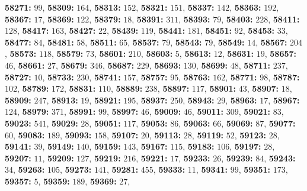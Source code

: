 \textsf{\bfseries 58271:} $99$, \textsf{\bfseries 58309:} $164$, \textsf{\bfseries 58313:} $152$, \textsf{\bfseries 58321:} $151$, \textsf{\bfseries 58337:} $142$, \textsf{\bfseries 58363:} $192$, \textsf{\bfseries 58367:} $17$, \textsf{\bfseries 58369:} $122$, \textsf{\bfseries 58379:} $18$, \textsf{\bfseries 58391:} $311$, \textsf{\bfseries 58393:} $79$, \textsf{\bfseries 58403:} $228$, \textsf{\bfseries 58411:} $128$, \textsf{\bfseries 58417:} $163$, \textsf{\bfseries 58427:} $22$, \textsf{\bfseries 58439:} $119$, \textsf{\bfseries 58441:} $181$, \textsf{\bfseries 58451:} $92$, \textsf{\bfseries 58453:} $33$, \textsf{\bfseries 58477:} $84$, \textsf{\bfseries 58481:} $58$, \textsf{\bfseries 58511:} $65$, \textsf{\bfseries 58537:} $79$, \textsf{\bfseries 58543:} $79$, \textsf{\bfseries 58549:} $14$, \textsf{\bfseries 58567:} $204$, \textsf{\bfseries 58573:} $118$, \textsf{\bfseries 58579:} $73$, \textsf{\bfseries 58601:} $210$, \textsf{\bfseries 58603:} $5$, \textsf{\bfseries 58613:} $12$, \textsf{\bfseries 58631:} $19$, \textsf{\bfseries 58657:} $46$, \textsf{\bfseries 58661:} $27$, \textsf{\bfseries 58679:} $346$, \textsf{\bfseries 58687:} $229$, \textsf{\bfseries 58693:} $130$, \textsf{\bfseries 58699:} $48$, \textsf{\bfseries 58711:} $237$, \textsf{\bfseries 58727:} $10$, \textsf{\bfseries 58733:} $230$, \textsf{\bfseries 58741:} $157$, \textsf{\bfseries 58757:} $95$, \textsf{\bfseries 58763:} $162$, \textsf{\bfseries 58771:} $98$, \textsf{\bfseries 58787:} $102$, \textsf{\bfseries 58789:} $172$, \textsf{\bfseries 58831:} $110$, \textsf{\bfseries 58889:} $238$, \textsf{\bfseries 58897:} $117$, \textsf{\bfseries 58901:} $43$, \textsf{\bfseries 58907:} $18$, \textsf{\bfseries 58909:} $247$, \textsf{\bfseries 58913:} $19$, \textsf{\bfseries 58921:} $195$, \textsf{\bfseries 58937:} $250$, \textsf{\bfseries 58943:} $29$, \textsf{\bfseries 58963:} $17$, \textsf{\bfseries 58967:} $124$, \textsf{\bfseries 58979:} $371$, \textsf{\bfseries 58991:} $99$, \textsf{\bfseries 58997:} $46$, \textsf{\bfseries 59009:} $46$, \textsf{\bfseries 59011:} $309$, \textsf{\bfseries 59021:} $83$, \textsf{\bfseries 59023:} $541$, \textsf{\bfseries 59029:} $28$, \textsf{\bfseries 59051:} $117$, \textsf{\bfseries 59053:} $86$, \textsf{\bfseries 59063:} $66$, \textsf{\bfseries 59069:} $87$, \textsf{\bfseries 59077:} $60$, \textsf{\bfseries 59083:} $189$, \textsf{\bfseries 59093:} $158$, \textsf{\bfseries 59107:} $20$, \textsf{\bfseries 59113:} $28$, \textsf{\bfseries 59119:} $52$, \textsf{\bfseries 59123:} $28$, \textsf{\bfseries 59141:} $39$, \textsf{\bfseries 59149:} $140$, \textsf{\bfseries 59159:} $143$, \textsf{\bfseries 59167:} $115$, \textsf{\bfseries 59183:} $106$, \textsf{\bfseries 59197:} $28$, \textsf{\bfseries 59207:} $11$, \textsf{\bfseries 59209:} $127$, \textsf{\bfseries 59219:} $216$, \textsf{\bfseries 59221:} $17$, \textsf{\bfseries 59233:} $26$, \textsf{\bfseries 59239:} $84$, \textsf{\bfseries 59243:} $34$, \textsf{\bfseries 59263:} $105$, \textsf{\bfseries 59273:} $141$, \textsf{\bfseries 59281:} $455$, \textsf{\bfseries 59333:} $11$, \textsf{\bfseries 59341:} $99$, \textsf{\bfseries 59351:} $173$, \textsf{\bfseries 59357:} $5$, \textsf{\bfseries 59359:} $189$, \textsf{\bfseries 59369:} $27$, 
